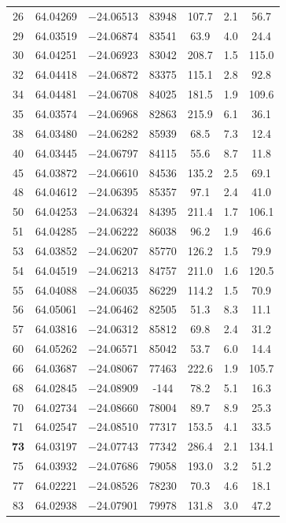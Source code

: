 \documentclass{aa}
\begin{document}
\begin{appendix}
\begin{longtable}{c c c c c c c}
26 & 64.04269 & $-$24.06513 & 83948 & 107.7 & 2.1 & 56.7 \\
29 & 64.03519 & $-$24.06874 & 83541 & 63.9 & 4.0 & 24.4 \\
30 & 64.04251 & $-$24.06923 & 83042 & 208.7 & 1.5 & 115.0 \\
32 & 64.04418 & $-$24.06872 & 83375 & 115.1 & 2.8 & 92.8 \\
34 & 64.04481 & $-$24.06708 & 84025 & 181.5 & 1.9 & 109.6 \\
35 & 64.03574 & $-$24.06968 & 82863 & 215.9 & 6.1 & 36.1 \\
38 & 64.03480 & $-$24.06282 & 85939 & 68.5 & 7.3 & 12.4 \\
40 & 64.03445 & $-$24.06797 & 84115 & 55.6 & 8.7 & 11.8 \\
45 & 64.03872 & $-$24.06610 & 84536 & 135.2 & 2.5 & 69.1 \\
48 & 64.04612 & $-$24.06395 & 85357 & 97.1 & 2.4 & 41.0 \\
50 & 64.04253 & $-$24.06324 & 84395 & 211.4 & 1.7 & 106.1 \\
51 & 64.04285 & $-$24.06222 & 86038 & 96.2 & 1.9 & 46.6 \\
53 & 64.03852 & $-$24.06207 & 85770 & 126.2 & 1.5 & 79.9 \\
54 & 64.04519 & $-$24.06213 & 84757 & 211.0 & 1.6 & 120.5 \\
55 & 64.04088 & $-$24.06035 & 86229 & 114.2 & 1.5 & 70.9 \\
56 & 64.05061 & $-$24.06462 & 82505 & 51.3 & 8.3 & 11.1 \\
57 & 64.03816 & $-$24.06312 & 85812 & 69.8 & 2.4 & 31.2 \\
60 & 64.05262 & $-$24.06571 & 85042 & 53.7 & 6.0 & 14.4 \\
66 & 64.03687 & $-$24.08067 & 77463 & 222.6 & 1.9 & 105.7 \\
68 & 64.02845 & $-$24.08909 & -144 & 78.2 & 5.1 & 16.3 \\
70 & 64.02734 & $-$24.08660 & 78004 & 89.7 & 8.9 & 25.3 \\
71 & 64.02547 & $-$24.08510 & 77317 & 153.5 & 4.1 & 33.5 \\
\textbf{73} & 64.03197 & $-$24.07743 & 77342 & 286.4 & 2.1 & 134.1 \\
75 & 64.03932 & $-$24.07686 & 79058 & 193.0 & 3.2 & 51.2 \\
77 & 64.02221 & $-$24.08526 & 78230 & 70.3 & 4.6 & 18.1 \\
83 & 64.02938 & $-$24.07901 & 79978 & 131.8 & 3.0 & 47.2 \\

\end{longtable}
\end{appendix}
\end{document}
